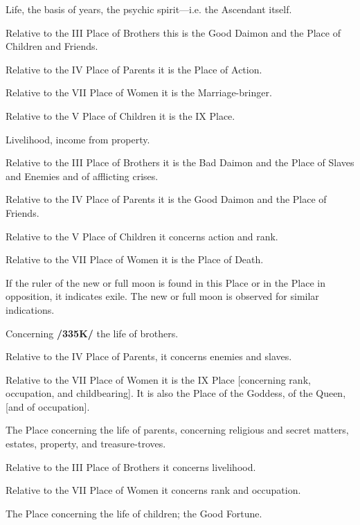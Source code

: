 \begin{description}[labelindent=0em , labelwidth=1em, labelsep=1em, leftmargin =!]
\item[I.] 
	Life, the basis of years, the psychic spirit—i.e. the Ascendant itself.
	
	Relative to the III Place of Brothers this is the Good Daimon and the Place of Children and Friends. 
	
	Relative to the IV Place of Parents it is the Place of Action. 
	
	Relative to the VII Place of Women it is the Marriage-bringer. 		
	
	Relative to the V Place of Children it is the IX Place.
	
\item[II.]
	 Livelihood, income from property. 
	 
	 Relative to the III Place of Brothers it is the Bad Daimon and the Place of Slaves and Enemies and of afflicting crises. 
	 
	 Relative to the IV Place of Parents it is the Good Daimon and the Place of Friends. 
	 
	 Relative to the V Place of Children it concerns action and rank. 
	 
	 Relative to the VII Place of Women it is the Place of Death. 
	 
	 If the ruler of the new or full moon is found in this Place or in the Place in opposition, it indicates exile. The new or full moon is observed for similar indications.

\item[III.]
	Concerning \textbf{/335K/} the life of brothers. 
	
	Relative to the IV Place of Parents, it concerns enemies and slaves. 
	
	Relative to the VII Place of Women it is the IX Place [concerning rank, occupation, and childbearing]. It is also the Place of the Goddess, of the Queen, [and of occupation].

\item[IV.] 
	The Place concerning the life of parents, concerning religious and secret matters, estates, property, and treasure-troves. 
	
	Relative to the III Place of Brothers it concerns livelihood. 
	
	Relative to the VII Place of Women it concerns rank and occupation. 

\item[V.] 
	The Place concerning the life of children; the Good Fortune. 
	

\end{description}
